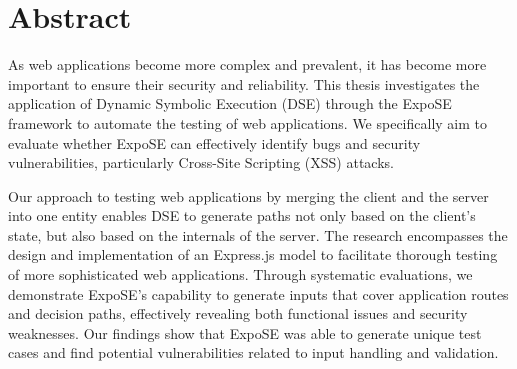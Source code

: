 \chapter*{Abstract}

As web applications become more complex and prevalent, it has become more important to ensure their security and reliability. This thesis investigates the application of Dynamic Symbolic Execution (DSE) through the ExpoSE framework to automate the testing of web applications. 
We specifically aim to evaluate whether ExpoSE can effectively identify bugs and security vulnerabilities, particularly Cross-Site Scripting (XSS) attacks.

Our approach to testing web applications by merging the client and the server into one entity enables DSE to generate paths not only based on the client's state, but also based on the internals of the server.
The research encompasses the design and implementation of an Express.js model to facilitate thorough testing of more sophisticated web applications. 
Through systematic evaluations, we demonstrate ExpoSE's capability to generate inputs that cover application routes and decision paths, effectively revealing both functional issues and security weaknesses. 
Our findings show that ExpoSE was able to generate unique test cases and find potential vulnerabilities related to input handling and validation.
